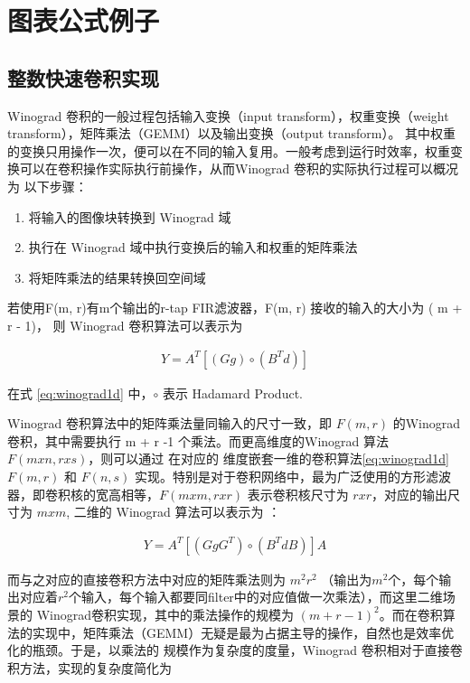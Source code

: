 
\chapter{图表公式例子}
\label{cha:chapter02}

\section{整数快速卷积实现}

Winograd 卷积的一般过程包括输入变换（input transform），权重变换（weight transform），矩阵乘法（GEMM）以及输出变换（output transform）。
其中权重的变换只用操作一次，便可以在不同的输入复用。一般考虑到运行时效率，权重变换可以在卷积操作实际执行前操作，从而Winograd 卷积的实际执行过程可以概况为
以下步骤：
\begin{enumerate}
  \item 将输入的图像块转换到 Winograd 域
  \item 执行在 Winograd 域中执行变换后的输入和权重的矩阵乘法
  \item 将矩阵乘法的结果转换回空间域
\end{enumerate}

若使用F(m, r)有m个输出的r-tap FIR滤波器，F(m, r) 接收的输入的大小为 ( m + r - 1)， 则 Winograd 卷积算法可以表示为

\begin{align}
\label{eq:winograd1d}
  Y = A^T [(Gg) \circ (B^Td)]
\end{align}

在式 \ref{eq:winograd1d} 中，$\circ$ 表示 Hadamard Product.

Winograd 卷积算法中的矩阵乘法量同输入的尺寸一致，即 $F(m, r)$ 的Winograd 卷积，其中需要执行 m + r -1 个乘法。而更高维度的Winograd 算法 $F(mxn, rxs)$，则可以通过
在对应的 维度嵌套一维的卷积算法\ref{eq:winograd1d} $F(m, r)$ 和 $F(n, s)$ 实现。特别是对于卷积网络中，最为广泛使用的方形滤波器，即卷积核的宽高相等，$F(m x m, r x r)$
表示卷积核尺寸为 $r x r$，对应的输出尺寸为 $ m x m$, 二维的 Winograd 算法可以表示为 ：

\begin{align}
\label{eq:winograd2d}
  Y = A^T [(GgG^T) \circ (B^TdB)] A
\end{align}

而与之对应的直接卷积方法中对应的矩阵乘法则为 $m^2r^2$ （输出为$m^2$个，每个输出对应着$r^2$个输入，每个输入都要同filter中的对应值做一次乘法），而这里二维场景的
Winograd卷积实现，其中的乘法操作的规模为 $( m + r - 1)^2$。而在卷积算法的实现中，矩阵乘法（GEMM）无疑是最为占据主导的操作，自然也是效率优化的瓶颈。于是，以乘法的
规模作为复杂度的度量，Winograd 卷积相对于直接卷积方法，实现的复杂度简化为

